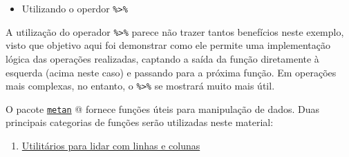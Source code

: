 \documentclass[
]{book}
\newenvironment{Shaded}{\begin{snugshade}}{\end{snugshade}}
\newcommand{\CommentTok}[1]{\textcolor[rgb]{0.56,0.35,0.01}{\textit{#1}}}
\newcommand{\DataTypeTok}[1]{\textcolor[rgb]{0.13,0.29,0.53}{#1}}
\newcommand{\DecValTok}[1]{\textcolor[rgb]{0.00,0.00,0.81}{#1}}
\newcommand{\KeywordTok}[1]{\textcolor[rgb]{0.13,0.29,0.53}{\textbf{#1}}}
\newcommand{\NormalTok}[1]{#1}
\newcommand{\OperatorTok}[1]{\textcolor[rgb]{0.81,0.36,0.00}{\textbf{#1}}}
\newcommand{\StringTok}[1]{\textcolor[rgb]{0.31,0.60,0.02}{#1}}
\providecommand{\tightlist}{%
  \setlength{\itemsep}{0pt}\setlength{\parskip}{0pt}}
\begin{document}
\begin{itemize}
\tightlist
\item
  Utilizando o operdor \texttt{\%\textgreater{}\%}
\end{itemize}

\begin{Shaded}
\end{Shaded}

A utilização do operador \texttt{\%\textgreater{}\%} parece não trazer tantos benefícios neste exemplo, visto que objetivo aqui foi demonstrar como ele permite uma implementação lógica das operações realizadas, captando a saída da função diretamente à esquerda (acima neste caso) e passando para a próxima função. Em operações mais complexas, no entanto, o \texttt{\%\textgreater{}\%} se mostrará muito mais útil.

O pacote \href{https://tiagoolivoto.github.io/metan/}{\texttt{metan}} @ fornece funções úteis para manipulação de dados. Duas principais categorias de funções serão utilizadas neste material:

\begin{enumerate}
\def\labelenumi{\arabic{enumi}.}
\tightlist
\item
  \href{https://tiagoolivoto.github.io/metan/reference/utils_rows_cols.html}{Utilitários para lidar com linhas e colunas}
\end{enumerate}
\end{document}
